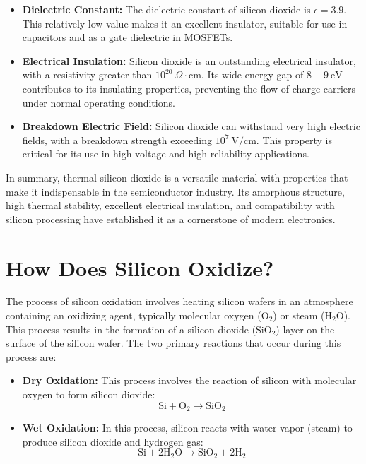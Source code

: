 \documentclass{report}
\begin{document}
\begin{itemize}
    \item \textbf{Dielectric Constant:} The dielectric constant of silicon dioxide is $\epsilon=3.9$. This relatively low value makes it an excellent insulator, suitable for use in capacitors and as a gate dielectric in MOSFETs.
    \item \textbf{Electrical Insulation:} Silicon dioxide is an outstanding electrical insulator, with a resistivity greater than $10^{20}~\Omega\cdot\text{cm}$. Its wide energy gap of $8-9~\text{eV}$ contributes to its insulating properties, preventing the flow of charge carriers under normal operating conditions.
    \item \textbf{Breakdown Electric Field:} Silicon dioxide can withstand very high electric fields, with a breakdown strength exceeding $10^{7}~\text{V}/\text{cm}$. This property is critical for its use in high-voltage and high-reliability applications.
\end{itemize}

In summary, thermal silicon dioxide is a versatile material with properties that make it indispensable in the semiconductor industry. Its amorphous structure, high thermal stability, excellent electrical insulation, and compatibility with silicon processing have established it as a cornerstone of modern electronics.
\section{How Does Silicon Oxidize?}

The process of silicon oxidation involves heating silicon wafers in an atmosphere containing an oxidizing agent, typically molecular oxygen ($\text{O}_{2}$) or steam ($\text{H}_{2}\text{O}$). This process results in the formation of a silicon dioxide ($\text{SiO}_{2}$) layer on the surface of the silicon wafer. The two primary reactions that occur during this process are:

\begin{itemize}
    \item \textbf{Dry Oxidation:} This process involves the reaction of silicon with molecular oxygen to form silicon dioxide:
    $$\text{Si} + \text{O}_{2} \rightarrow \text{SiO}_{2}$$
    \item \textbf{Wet Oxidation:} In this process, silicon reacts with water vapor (steam) to produce silicon dioxide and hydrogen gas:
    $$\text{Si} + 2\text{H}_{2}\text{O} \rightarrow \text{SiO}_{2} + 2\text{H}_{2}$$
\end{itemize}
\end{document}
